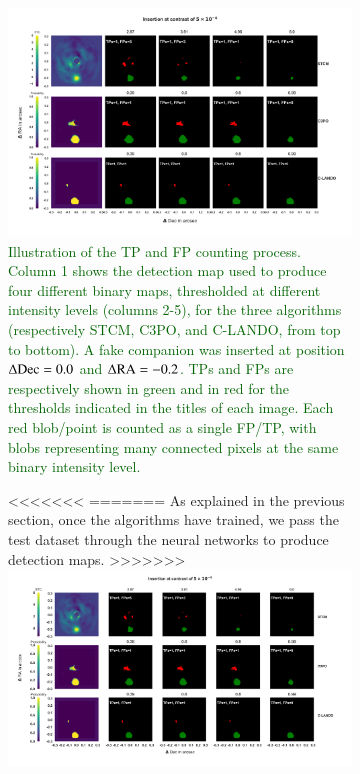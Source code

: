 \documentclass{aa}
\newcommand{\newchange}[1]{\textcolor{darkgreen}{#1}}
\begin{document}
{{{\begin{figure}[t]
\begin{figure}[t]
    \centering
    \includegraphics[width=\textwidth]{Fig3_Sep2023.png}
    \caption{\newchange{Illustration of the TP and FP counting process. Column 1 shows the detection map used to produce four different binary maps, thresholded at different intensity levels (columns 2-5), for the three algorithms (respectively STCM, C3PO, and C-LANDO, from top to bottom). A fake companion was inserted at position $\Delta{\rm Dec}=0.0$ and $\Delta{\rm RA} = -0.2$. TPs and FPs are respectively shown in green and in red for the thresholds indicated in the titles of each image. Each red blob/point is counted as a single FP/TP, with blobs representing many connected pixels at the same binary intensity level.}}
\end{figure}
\begin{figure}[t]
<<<<<<<
=======
As explained in the previous section, once the algorithms have trained, we pass the test dataset through the neural networks to produce detection maps.
>>>>>>>
    \centering
    \includegraphics[width=\textwidth]{Fig3_Mar2024_referee.png}

\end{figure}
\end{figure}}}}
\end{document}
